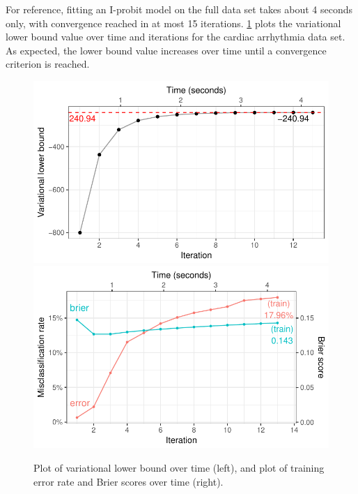 \documentclass[a4paper,showframe,11pt]{report}\usepackage[]{graphicx}\usepackage[]{color}
\newenvironment{knitrout}{}{} %
\begin{document}
For reference, fitting an I-probit model on the full data set takes about 4 seconds only, with convergence reached in at most 15 iterations.
\cref{fig:cardiac.mod.full.plot} plots the variational lower bound value over time and iterations for the cardiac arrhythmia data set.
As expected, the lower bound value increases over time until a convergence criterion is reached.




\begin{knitrout}
\color{fgcolor}\begin{figure}[t]

{\centering \includegraphics[width=0.49\linewidth]{figure/05-cardiac_mod_full_plot-1} 
\includegraphics[width=0.49\linewidth]{figure/05-cardiac_mod_full_plot-2} 

}

\caption[Plot of variational lower bound over time (left), and plot of training error rate and Brier scores over time (right)]{Plot of variational lower bound over time (left), and plot of training error rate and Brier scores over time (right).}\label{fig:cardiac.mod.full.plot}
\end{figure}


\end{knitrout}
\end{document}

